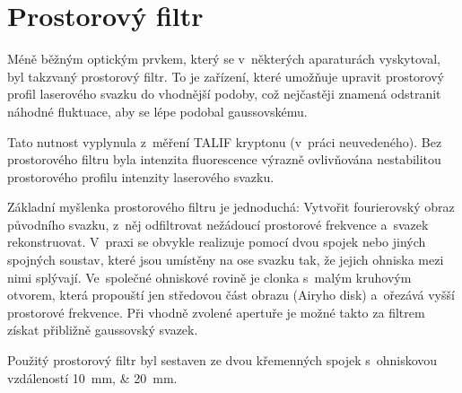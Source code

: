 \section{Prostorový filtr}
\label{sec:instruments-spatialfilter}
Méně běžným optickým prvkem, který se v~některých aparaturách vyskytoval,
byl takzvaný prostorový filtr.
To je zařízení, které umožňuje upravit prostorový profil laserového svazku
do vhodnější podoby, což nejčastěji znamená odstranit náhodné fluktuace,
aby se lépe podobal gaussovskému.

Tato nutnost vyplynula z~měření TALIF kryptonu (v~práci neuvedeného).
Bez prostorového filtru byla intenzita fluorescence výrazně ovlivňována
nestabilitou prostorového profilu intenzity laserového svazku.

Základní myšlenka prostorového filtru je jednoduchá:
Vytvořit fourierovský obraz původního svazku,
z~něj odfiltrovat nežádoucí prostorové frekvence
a~svazek rekonstruovat.
V~praxi se obvykle realizuje pomocí dvou spojek nebo jiných spojných soustav,
které jsou umístěny na ose svazku tak, že jejich ohniska mezi nimi splývají.
Ve~společné ohniskové rovině je clonka s~malým kruhovým otvorem,
která propouští jen středovou část obrazu (Airyho disk)
a~ořezává vyšší prostorové frekvence.
Při vhodně zvolené apertuře je možné takto za filtrem získat přibližně
gaussovský svazek.

Použitý prostorový filtr byl sestaven ze dvou křemenných spojek
s~ohniskovou vzdáleností \SIlist{10;20}{\milli\metre}.
